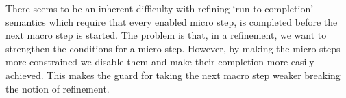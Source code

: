 There seems to be an inherent difficulty with refining `run to completion' semantics which require that every enabled micro step, is completed before the next macro step is started. The problem is that, in a refinement, we want to strengthen the conditions for a micro step. However, by making the micro steps more constrained we disable them and make their completion more easily achieved. This makes the guard for taking the next macro step weaker breaking the notion of refinement.










